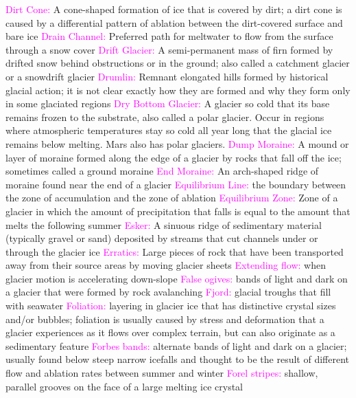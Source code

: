 \documentclass{article}
\newcommand{\pink}[1]{\textcolor{magenta}{#1}}
\newcommand{\vocab}[1]{{\pink{#1}}}
\begin{document}
\begin{multicols*}{4}
		\vocab{        Dirt Cone: } A cone-shaped formation of ice that is covered by dirt; a dirt cone is caused by a differential pattern of ablation between the dirt-covered surface and bare ice 
		\vocab{        Drain Channel: } Preferred path for meltwater to flow from the surface through a snow cover 
		\vocab{        Drift Glacier: } A semi-permanent mass of firn formed by drifted snow behind obstructions or in the ground; also called a catchment glacier or a snowdrift glacier 
		\vocab{        Drumlin: } Remnant elongated hills formed by historical glacial action; it is not clear exactly how they are formed and why they form only in some glaciated regions 
		\vocab{Dry Bottom Glacier: } A glacier so cold that its base remains frozen to the substrate, also called a polar glacier. Occur in regions where atmospheric temperatures stay so cold all year long that the glacial ice remains below melting. Mars also has polar glaciers.  
		\vocab{        Dump Moraine: } A mound or layer of moraine formed along the edge of a glacier by rocks that fall off the ice; sometimes called a ground moraine 
		\vocab{        End Moraine: } An arch-shaped ridge of moraine found near the end of a glacier 
		\vocab{Equilibrium Line: }the boundary between the zone of accumulation and the zone of ablation 
		\vocab{        Equilibrium Zone: } Zone of a glacier in which the amount of precipitation that falls is equal to the amount that melts the following summer 
		\vocab{        Esker: } A sinuous ridge of sedimentary material (typically gravel or sand) deposited by streams that cut channels under or through the glacier ice 
		\vocab{Erratics: } Large pieces of rock that have been transported away from their source areas by moving glacier sheets  
		\vocab{        Extending flow: } when glacier motion is accelerating down-slope 
		\vocab{        False ogives: } bands of light and dark on a glacier that were formed by rock avalanching 
		\vocab{        Fjord: } glacial troughs that fill with seawater 
		\vocab{        Foliation: } layering in glacier ice that has distinctive crystal sizes and/or bubbles; foliation is usually caused by stress and deformation that a glacier experiences as it flows over complex terrain, but can also originate as a sedimentary feature 
		\vocab{        Forbes bands: } alternate bands of light and dark on a glacier; usually found below steep narrow icefalls and thought to be the result of different flow and ablation rates between summer and winter 
		\vocab{        Forel stripes: } shallow, parallel grooves on the face of a large melting ice crystal  

\end{multicols*}
\end{document}
